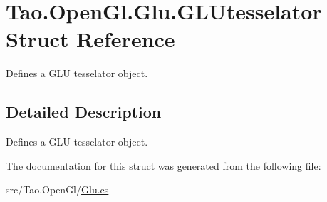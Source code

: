 \hypertarget{struct_tao_1_1_open_gl_1_1_glu_1_1_g_l_utesselator}{
\section{Tao.OpenGl.Glu.GLUtesselator Struct Reference}
\label{struct_tao_1_1_open_gl_1_1_glu_1_1_g_l_utesselator}
}


Defines a GLU tesselator object.  




\subsection{Detailed Description}
Defines a GLU tesselator object. 

The documentation for this struct was generated from the following file:\begin{DoxyCompactItemize}
\item 
src/Tao.OpenGl/\hyperlink{_glu_8cs}{Glu.cs}\end{DoxyCompactItemize}

